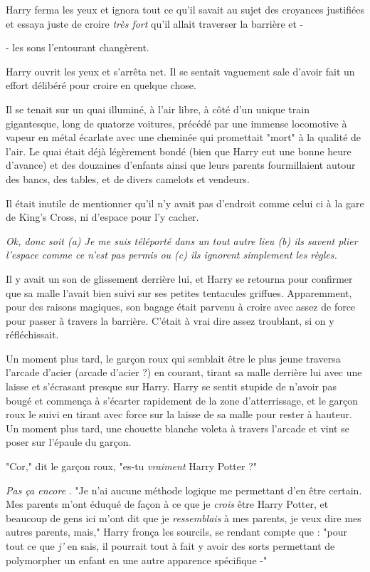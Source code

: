 Harry ferma les yeux et ignora tout ce qu'il savait au sujet des croyances justifiées et essaya juste de croire \emph{très fort}  qu'il allait traverser la barrière et -

- les sons l'entourant changèrent.

Harry ouvrit les yeux et s'arrêta net. Il se sentait vaguement sale d'avoir fait un effort délibéré pour croire en quelque chose.

Il se tenait sur un quai illuminé, à l'air libre, à côté d'un unique train gigantesque, long de quatorze voitures, précédé par une immense locomotive à vapeur en métal écarlate avec une cheminée qui promettait "mort" à la qualité de l'air. Le quai était déjà légèrement bondé (bien que Harry eut une bonne heure d'avance) et des douzaines d'enfants ainsi que leurs parents fourmillaient autour des bancs, des tables, et de divers camelots et vendeurs.

Il était inutile de mentionner qu'il n'y avait pas d'endroit comme celui ci à la gare de King's Cross, ni d'espace pour l'y cacher.

\emph{Ok, donc soit (a) Je me suis téléporté dans un tout autre lieu (b) ils savent plier l'espace comme ce n'est pas permis ou (c) ils ignorent simplement les règles.} 

Il y avait un son de glissement derrière lui, et Harry se retourna pour confirmer que sa malle l'avait bien suivi sur ses petites tentacules griffues. Apparemment, pour des raisons magiques, son bagage était parvenu à croire avec assez de force pour passer à travers la barrière. C'était à vrai dire assez troublant, si on y réfléchissait.

Un moment plus tard, le garçon roux qui semblait être le plus jeune traversa l'arcade d'acier (arcade d'acier ?) en courant, tirant sa malle derrière lui avec une laisse et s'écrasant presque sur Harry. Harry se sentit stupide de n'avoir pas bougé et commença à s'écarter rapidement de la zone d'atterrissage, et le garçon roux le suivi en tirant avec force sur la laisse de sa malle pour rester à hauteur. Un moment plus tard, une chouette blanche voleta à travers l'arcade et vint se poser sur l'épaule du garçon.

"Cor," dit le garçon roux, "es-tu \emph{vraiment}  Harry Potter ?"

\emph{Pas ça encore} . "Je n'ai aucune méthode logique me permettant d'en être certain. Mes parents m'ont éduqué de façon à ce que je \emph{crois}  être Harry Potter, et beaucoup de gens ici m'ont dit que je \emph{ressemblais}  à mes parents, je veux dire mes autres parents, mais," Harry fronça les sourcils, se rendant compte que : "pour tout ce que \emph{j'} en sais, il pourrait tout à fait y avoir des sorts permettant de polymorpher un enfant en une autre apparence spécifique -"

